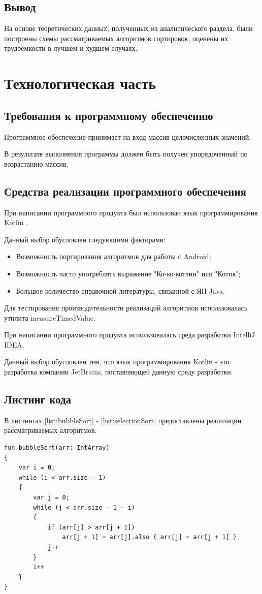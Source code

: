 \documentclass[12pt]{report}
\begin{document}
\section*{Вывод}
На основе теоретических данных, полученных из аналитического раздела, были построены схемы рассматриваемых алгоритмов сортировок, оценены их трудоёмкости в лучшем и худшем случаях.

\chapter{Технологическая часть}
\section{Требования к программному обеспечению}
Программное обеспечение принимает на вход массив целочисленных значений.

В результате выполнения программы должен быть получен упорядоченный по возрастанию массив.

\section{Средства реализации программного обеспечения}
При написании программного продукта был использован язык программирования Kotlin \cite{Kotlin}.

Данный выбор обусловлен следующими факторами:
\begin{itemize}
\item Возможность портирования алгоритмов для работы с Android;
\item Возможность часто употреблять выражение "Ко-ко-котлин" или "Котик";
\item Большое количество справочной литературы, связанной с ЯП Java.
\end{itemize}

Для тестирования производительности реализаций алгоритмов использовалась утилита measureTimedValue.

При написании программного продукта использовалась среда разработки IntelliJ IDEA.

Данный выбор обусловлен тем, что язык программирования Kotlin - это разработка компании JetBrains, поставляющей данную среду разработки.

\section{Листинг кода}
В листингах \ref{list:bubbleSort} - \ref{list:selectionSort} предоставлены реализации рассматриваемых алгоритмов.
\begin{lstlisting}[caption=Функция реализации алгоритма сортировки пузырьком,
label={list:bubbleSort}]
fun bubbleSort(arr: IntArray)
{
    var i = 0;
    while (i < arr.size - 1)
    {
        var j = 0;
        while (j < arr.size - 1 - i)
        {
            if (arr[j] > arr[j + 1])
                arr[j + 1] = arr[j].also { arr[j] = arr[j + 1] }
            j++
        }
        i++
    }
}
\end{lstlisting}
\end{document}
